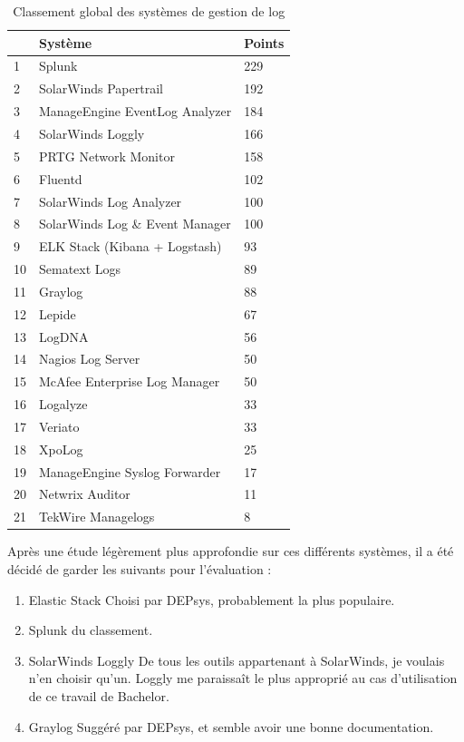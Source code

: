 \documentclass[paper=a4, fontsize=11pt]{scrartcl}
\begin{document}
\centering
\begin{table}
\centering
\begin{tabular}{ |p{2cm}|p{6cm}|p{1cm}| } 
    \hline
     & Système & Points\\
    \hline
    1 & Splunk & 229\\
    2 & SolarWinds Papertrail & 192\\
    3 & ManageEngine EventLog Analyzer & 184\\
    4 & SolarWinds Loggly & 166\\
    5 & PRTG Network Monitor & 158\\
    6 & Fluentd & 102\\
    7 & SolarWinds Log Analyzer & 100\\
    8 & SolarWinds Log \& Event Manager & 100\\
    9 & ELK Stack (Kibana + Logstash)  & 93\\
    10 & Sematext Logs & 89\\
    11 & Graylog & 88\\
    12 & Lepide & 67\\
    13 & LogDNA & 56\\
    14 & Nagios Log Server & 50\\
    15 & McAfee Enterprise Log Manager & 50\\
    16 & Logalyze & 33\\
    17 & Veriato & 33\\
    18 & XpoLog & 25\\
    19 & ManageEngine Syslog Forwarder & 17\\
    20 & Netwrix Auditor & 11\\
    21 & TekWire Managelogs & 8\\
    \hline
\end{tabular}
\caption{Classement global des systèmes de gestion de log}
\label{t-classementGlobal}
\end{table}
\justify

Après une étude légèrement plus approfondie sur ces différents systèmes, il a été décidé de garder les suivants pour l'évaluation :

\begin{enumerate}
    \item Elastic Stack
    \subitem Choisi par DEPsys, probablement la plus populaire.
    \item Splunk
     du classement.
    \item SolarWinds Loggly
    \subitem De tous les outils appartenant à SolarWinds, je voulais n'en choisir qu'un. Loggly me paraissaît le plus approprié au cas d'utilisation de ce travail de Bachelor.
    \item Graylog
    \subitem Suggéré par DEPsys, et semble avoir une bonne documentation.
\end{enumerate}
\end{document}
